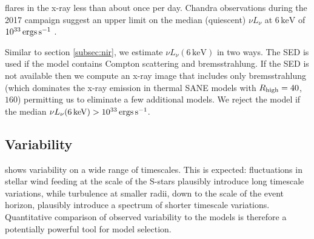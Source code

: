 \sgra flares in the x-ray less than about once per day.  Chandra observations during the 2017 campaign suggest an upper limit on the median (quiescent) $\nu L_\nu$ at $6\,\mathrm{keV}$ of $10^{33}\,\mathrm{ergs\,s^{-1}}$ \citep{PaperIII}.

Similar to section \ref{subsec:nir}, we estimate $\nu L_\nu(6\,\mathrm{keV})$ in two ways.  The SED is used if the model contains Compton scattering and bremsstrahlung.  If the SED is not available then we compute an x-ray image that includes only bremsstrahlung (which dominates the x-ray emission in thermal SANE models with $R_\mathrm{high} = 40$, $160$) permitting us to eliminate a few additional models.  We reject the model if the median $\nu L_\nu(6\,\mathrm{keV}) > 10^{33}\,\mathrm{ergs\,s^{-1}}$.

\subsection{Variability}

%


\sgra shows variability on a wide range of timescales.  This is expected: fluctuations in stellar wind feeding at the scale of the S-stars plausibly introduce long timescale variations, while turbulence at smaller radii, down to the scale of the event horizon, plausibly introduce a spectrum of shorter timescale variations.  Quantitative comparison of observed variability to the models is therefore a potentially powerful tool for model selection.

